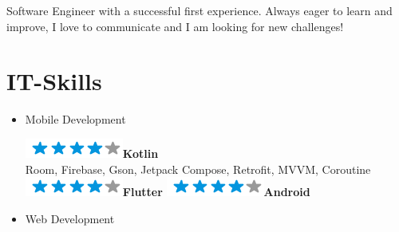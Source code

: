 \documentclass[]{friggeri-cv}
\begin{document}
\vspace{-3mm}
\begin{minipage}[t]{1.00\linewidth}
Software Engineer with a successful first experience. Always eager to learn and improve, I love to communicate and I am looking for new challenges!
\end{minipage} %
\vspace{1mm}

\section{IT-Skills}
        \vspace*{-0.45cm}
        \setlength{\columnsep}{-0.3cm}
        \begin{flushleft}
        \begin{multicols}{3}
		\begin{itemize}
		
		\setlength{\itemsep}{5pt}
  		\setlength{\parskip}{0pt}
  		\setlength{\parsep}{0pt}
          
        
\item \large Mobile Development \
\normalsize
\begin{flushleft}

\includegraphics[scale=0.40]{res/img/4stars.png}\hspace{1.5mm}\textbf{Kotlin}\\Room, Firebase, Gson, Jetpack Compose, Retrofit, MVVM, Coroutine\\\vspace{2mm}
\includegraphics[scale=0.40]{res/img/4stars.png}\hspace{1.5mm}\textbf{Flutter}
\includegraphics[scale=0.40]{res/img/4stars.png}\hspace{1.5mm}\textbf{Android}
\end{flushleft}            

\item \large Web Development \
\normalsize
\begin{flushleft}


\end{flushleft}
\end{itemize}
\end{multicols}
\end{flushleft}
\end{document}
